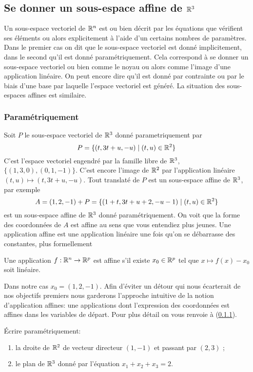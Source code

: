 \documentclass[11pt, a4paper]{article}
\begin{document}
\subsection{Se donner un sous-espace affine de $\mathbb{R}^3$}

Un sous-espace vectoriel de $\mathbb{R}^n$ est ou bien décrit par les
équations que vérifient ses éléments ou alors explicitement à l'aide
d'un certains nombres de paramètres. Dans le premier cas on dit que le
sous-espace vectoriel est donné implicitement, dans le second qu'il
est donné paramétriquement. Cela correspond à se donner un sous-espace
vectoriel ou bien comme le noyau ou alors comme l'image d'une
application linéaire. On peut encore dire qu'il est donné par
contrainte ou par le biais d'une base par laquelle l'espace vectoriel
est généré. La situation des sous-espaces affines est similaire.

\subsubsection{Paramétriquement}

Soit $P$ le sous-espace vectoriel de $\mathbb{R}^3$ donné parametriquement par
\[
P = \{(t, 3t+u, -u) \mid (t, u) \in \mathbb{R}^2\}
\]
C'est l'espace vectoriel engendré par la famille libre de $\mathbb{R}^3$,
$\{(1, 3, 0), (0, 1, -1)\}$.  C'est encore l'image de $\mathbb{R}^2$ par
l'application linéaire $(t, u) \mapsto (t, 3t+u, -u)$. Tout translaté
de $P$ est un sous-espace affine de $\mathbb{R}^3$, par exemple
\[
A = (1, 2, -1) + P = \{(1+t, 3t+u+2, -u-1)\mid (t, u) \in \mathbb{R}^2\}
\]
est un sous-espace affine de $\mathbb{R}^3$ donné paramétriquement. On voit
que la forme des coordonnées de $A$ est affine au sens que vous
entendiez plus jeunes. Une application affine est une application
linéaire une fois qu'on se débarrasse des constantes, plus
formellement
\begin{defn}
  Une application $f : \mathbb{R}^n \rightarrow \mathbb{R}^p$ est
  affine s'il existe $x_0 \in \mathbb{R}^p$ tel que
  $x \mapsto f(x) - x_0$ soit linéaire.
\end{defn}
Dans notre cas $x_0 = (1, 2, -1)$. Afin d'éviter un détour qui nous
écarterait de nos objectifs premiers nous garderons l'approche
intuitive de la notion d'application affines: une applications dont
l'expression des coordonnées est affines dans les variables de
départ. Pour plus détail on vous renvoie à (\ref{}).
\begin{question}
  Écrire paramétriquement:
  \begin{enumerate}
  \item la droite de $\mathbb{R}^2$ de vecteur directeur $(1, -1)$ et passant
    par $(2, 3)$ ;
  \item le plan de $\mathbb{R}^3$ donné par l'équation $x_1 + x_2 + x_3 = 2$.
  \end{enumerate}
\end{question}
\end{document}
